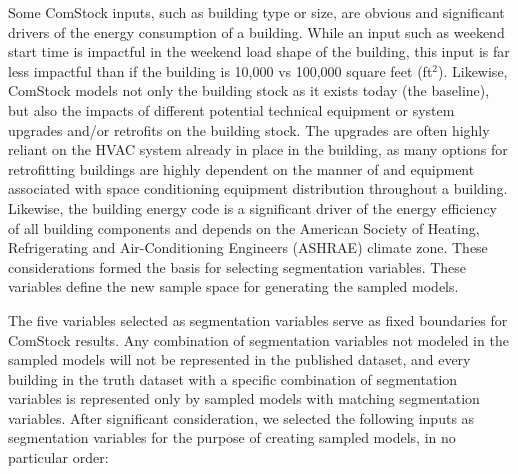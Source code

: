 Some ComStock inputs, such as building type or size, are obvious and significant drivers of the energy consumption of a building. While an input such as weekend start time is impactful in the weekend load shape of the building, this input is far less impactful than if the building is 10,000 vs 100,000 square feet (ft$^2$). Likewise, ComStock models not only the building stock as it exists today (the baseline), but also the impacts of different potential technical equipment or system upgrades and/or retrofits on the building stock. The upgrades are often highly reliant on the HVAC system already in place in the building, as many options for retrofitting buildings are highly dependent on the manner of and equipment associated with space conditioning equipment distribution throughout a building. Likewise, the building energy code is a significant driver of the energy efficiency of all building components and depends on the American Society of Heating, Refrigerating and Air-Conditioning Engineers (ASHRAE) climate zone. These considerations formed the basis for selecting segmentation variables. These variables define the new sample space for generating the sampled models.

The five variables selected as segmentation variables serve as fixed boundaries for ComStock results. Any combination of segmentation variables not modeled in the sampled models will not be represented in the published dataset, and every building in the truth dataset with a specific combination of segmentation variables is represented only by sampled models with matching segmentation variables. After significant consideration, we selected the following inputs as segmentation variables for the purpose of creating sampled models, in no particular order:

